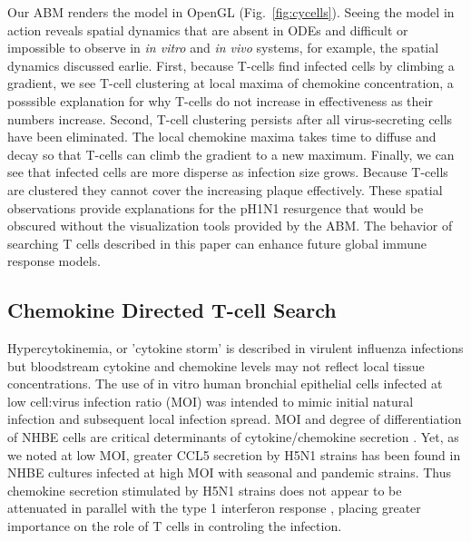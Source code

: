 \documentclass[10pt]{article}
\begin{document}
Our ABM renders the model in OpenGL (Fig.~\ref{fig:cycells}).  Seeing the model in action reveals spatial dynamics that are absent in ODEs and difficult or impossible to observe in \textit{in vitro} and \textit{in vivo} systems, for example, the spatial dynamics discussed earlie.  First, because T-cells find infected cells by climbing a gradient, we see T-cell clustering at local maxima of chemokine concentration, a posssible explanation for why T-cells do not increase in effectiveness as their numbers increase.   Second, T-cell clustering persists after all virus-secreting cells have been eliminated.  The local chemokine maxima takes time to diffuse and decay so that T-cells can climb the gradient to a new maximum.  Finally, we can see that infected cells are more disperse as infection size grows.  Because T-cells are clustered they cannot cover the increasing plaque effectively.  These spatial observations provide explanations for the pH1N1 resurgence that would be obscured without the visualization tools provided by the ABM.   The behavior of searching T cells described in this paper 
can enhance future global immune response models.

\subsection*{Chemokine Directed T-cell Search}

Hypercytokinemia, or 'cytokine storm' is described in virulent influenza infections \cite{DeJong2006} but bloodstream cytokine and chemokine levels may not reflect local tissue concentrations.  The use of in vitro human bronchial epithelial cells \cite{Mitchell2011} infected at low cell:virus infection ratio (MOI) was intended to mimic initial natural infection and subsequent local infection spread.  MOI and degree of differentiation of NHBE cells are critical determinants of cytokine/chemokine secretion \cite{Chan2010}.   Yet, as we noted at low MOI, greater CCL5 secretion by H5N1 strains has been found in NHBE cultures infected at high MOI with seasonal \cite{Chan2005, Chan2010, Zeng2011} and pandemic \cite{Zeng2011} strains.  Thus chemokine secretion stimulated by H5N1 strains does not appear to be attenuated in parallel with the type 1 interferon response \cite{Zeng2007}, placing greater importance on the role of T cells in controling the infection.
\end{document}
